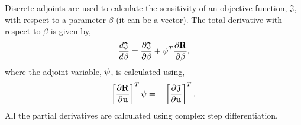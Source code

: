 \documentclass[%
notitlepage,
]{revtex4-1}
\newcommand{\be}{\ensuremath{{\beta}}\xspace}
\newcommand{\mat}[1]{{\ensuremath{\bf{ #1}}}}
\begin{document}
Discrete adjoints are used to calculate the sensitivity of an objective function, $\mathfrak{J}$, with respect to a parameter $\be$ (it can be a vector). The total derivative with respect to \be is given by,
\begin{eqnarray}
\frac{d \mathfrak{J}}{d\be} =  \frac{\partial\mathfrak{J}}{\partial \be} + \mat{\psi}^T\frac{\partial \mat{R}}{ \partial \be},
\label{eq:appendix:1}
\end{eqnarray}
where the adjoint variable, $\mat{\psi}$, is calculated using,
\begin{eqnarray}
\left[\frac{\partial \mat{R}}{\partial \mat{{u}}}\right]^T \mat{\psi} = -\left[\frac{\partial \mathfrak{J}}{\partial \mat{{u}}}\right]^T.
\label{eq:appendix:2}
\end{eqnarray}
All the partial derivatives are calculated using complex step differentiation.
\end{document}
